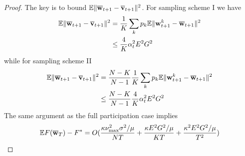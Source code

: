 \begin{proof}
	The key is to bound $\mathbb{E}\|{\overline{\mathbf{w}}}_{t+1}-{\overline{\mathbf{v}}}_{t+1}\|^{2}$.
	For sampling scheme I we have 
	\begin{align*}
	\mathbb{E}\|{\overline{\mathbf{w}}}_{t+1}-{\overline{\mathbf{v}}}_{t+1}\|^{2} & =\frac{1}{K}\sum_{k}p_{k}\mathbb{E}\|{\mathbf{w}}_{t+1}^{k}-{\overline{\mathbf{w}}}_{t+1}\|^{2}\\
	& \leq\frac{4}{K}\alpha_{t}^{2}E^{2}G^{2}
	\end{align*}
	while for sampling scheme II 
	\begin{align*}
	\mathbb{E}\|{\overline{\mathbf{w}}}_{t+1}-{\overline{\mathbf{v}}}_{t+1}\|^{2} & =\frac{N-K}{N-1}\frac{1}{K}\sum_{k}p_{k}\mathbb{E}\|{\mathbf{w}}_{t+1}^{k}-{\overline{\mathbf{w}}}_{t+1}\|^{2}\\
	& \leq\frac{N-K}{N-1}\frac{4}{K}\alpha_{t}^{2}E^{2}G^{2}
	\end{align*}
	The same argument as the full participation case implies 
	\begin{align*}
	\mathbb{E}F({\overline{\mathbf{w}}}_{T})-F^{\ast}=O(\frac{\kappa\nu_{\max}^{2}\sigma^{2}/\mu}{NT}+\frac{\kappa E^{2}G^{2}/\mu}{KT}+\frac{\kappa^{2}E^{2}G^{2}/\mu}{T^{2}})
	\end{align*}
	
	\begin{comment}
	\begin{proof}
	With partial participation, $2E\sum_{\tau=1}^{E-1}\alpha_{t-\tau}^{2}\sum_{k=1}^{N}p_{k}\left(\|\nabla F_{k}(\ov{w}_{t-\tau},\xi_{t-\tau}^{k})\|^{2}+l^{2}\|w_{t-\tau}^{k}-\ov{w}_{t-\tau}\|^{2}\right)$
	\begin{align*}
	\mathbb{E}\|\ov{w}_{t+1}-\vw^{\ast}\|^{2} & \leq\mathbb{E}(1-\mu\alpha_{t})\|\ov{w}_{t}-\vw^{\ast}\|^{2}+5E^{2}L\alpha_{t}^{3}G^{2}+\alpha_{t}^{2}\frac{1}{N}\nu_{max}^{2}\sigma^{2}+\frac{1}{K}\sum_{k}p^{k}\|\vw_{t}^{k}-\ov{w}_{t}\|^{2}\\
	& \leq\mathbb{E}(1-\mu\alpha_{t})\|\ov{w}_{t}-\vw^{\ast}\|^{2}+5E^{2}L\alpha_{t}^{3}G^{2}+\alpha_{t}^{2}\frac{1}{N}\nu_{max}^{2}\sigma^{2}+\frac{4}{K}\alpha_{t}^{2}E^{2}G^{2}\\
	& \leq\mathbb{E}(1-\mu\alpha_{t})(1-\mu\alpha_{t-1})\cdots(1-\mu\alpha_{t-E})\|\ov{w}_{t-E}-\vw^{\ast}\|^{2}=O(\frac{1}{t-E}\sigma^{2}+E^{2}LG^{2}\frac{1}{(t-E)^{2}}+\frac{E^{2}G^{2}}{K}\frac{1}{(t-E)^{3/2}})\\
	& +(\alpha_{t}^{3}+(1-\mu\alpha_{t-1})\alpha_{t-1}^{3}+(1-\mu\alpha_{t-1})(1-\mu\alpha_{t-2})\alpha_{t-2}^{3}+\cdots+(1-\mu\alpha_{t-1})\cdots(1-\mu\alpha_{t-E})\alpha_{t-E}^{3}E^{2}LG^{2}\\
	& +(\alpha_{t}^{2}+(1-\mu\alpha_{t-1})\alpha_{t-1}^{2}+(1-\mu\alpha_{t-1})(1-\mu\alpha_{t-2})\alpha_{t-2}^{2}+\cdots+(1-\mu\alpha_{t-1})\cdots(1-\mu\alpha_{t-E})\alpha_{t-E}^{2}\sigma^{2}\\
	& +\frac{4}{K}EG^{2}(\alpha_{t}^{2}+\alpha_{t-1}^{2}+\cdots+\alpha_{t-E}^{2})
	\end{align*}
	

\end{comment}
\end{proof}
